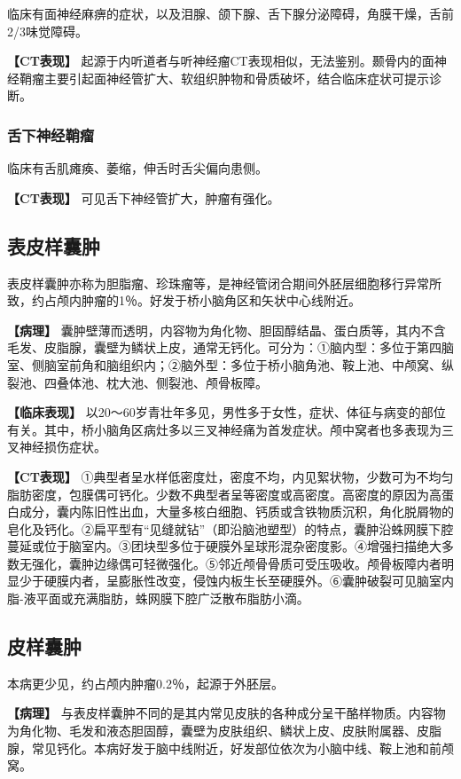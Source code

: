 临床有面神经麻痹的症状，以及泪腺、颌下腺、舌下腺分泌障碍，角膜干燥，舌前2/3味觉障碍。

\textbf{【CT表现】}
起源于内听道者与听神经瘤CT表现相似，无法鉴别。颞骨内的面神经鞘瘤主要引起面神经管扩大、软组织肿物和骨质破坏，结合临床症状可提示诊断。

\subsubsection{舌下神经鞘瘤}

临床有舌肌瘫痪、萎缩，伸舌时舌尖偏向患侧。

\textbf{【CT表现】} 可见舌下神经管扩大，肿瘤有强化。

\subsection{表皮样囊肿}

表皮样囊肿亦称为胆脂瘤、珍珠瘤等，是神经管闭合期间外胚层细胞移行异常所致，约占颅内肿瘤的1％。好发于桥小脑角区和矢状中心线附近。

\textbf{【病理】}
囊肿壁薄而透明，内容物为角化物、胆固醇结晶、蛋白质等，其内不含毛发、皮脂腺，囊壁为鳞状上皮，通常无钙化。可分为：①脑内型：多位于第四脑室、侧脑室前角和脑组织内；②脑外型：多位于桥小脑角池、鞍上池、中颅窝、纵裂池、四叠体池、枕大池、侧裂池、颅骨板障。

\textbf{【临床表现】}
以20～60岁青壮年多见，男性多于女性，症状、体征与病变的部位有关。其中，桥小脑角区病灶多以三叉神经痛为首发症状。颅中窝者也多表现为三叉神经损伤症状。

\textbf{【CT表现】}
①典型者呈水样低密度灶，密度不均，内见絮状物，少数可为不均匀脂肪密度，包膜偶可钙化。少数不典型者呈等密度或高密度。高密度的原因为高蛋白成分，囊内陈旧性出血，大量多核白细胞、钙质或含铁物质沉积，角化脱屑物的皂化及钙化。②扁平型有“见缝就钻”（即沿脑池塑型）的特点，囊肿沿蛛网膜下腔蔓延或位于脑室内。③团块型多位于硬膜外呈球形混杂密度影。④增强扫描绝大多数无强化，囊肿边缘偶可轻微强化。⑤邻近颅骨骨质可受压吸收。颅骨板障内者明显少于硬膜内者，呈膨胀性改变，侵蚀内板生长至硬膜外。⑥囊肿破裂可见脑室内脂-液平面或充满脂肪，蛛网膜下腔广泛散布脂肪小滴。

\subsection{皮样囊肿}

本病更少见，约占颅内肿瘤0.2％，起源于外胚层。

\textbf{【病理】}
与表皮样囊肿不同的是其内常见皮肤的各种成分呈干酪样物质。内容物为角化物、毛发和液态胆固醇，囊壁为皮肤组织、鳞状上皮、皮肤附属器、皮脂腺，常见钙化。本病好发于脑中线附近，好发部位依次为小脑中线、鞍上池和前颅窝。

